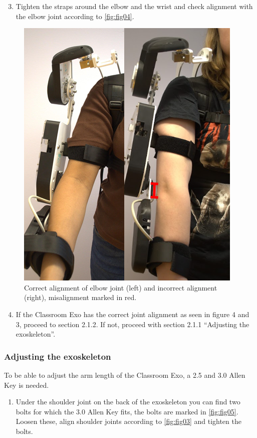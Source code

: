 \begin{enumerate}[]
	\setcounter{enumi}{2}
	\item Tighten the straps around the elbow and the wrist and check alignment with the elbow joint according to \autoref{fig:fig04}. 
\end{enumerate}

\begin{figure}[H]
	\centering
	\includegraphics[width=0.4\linewidth]{img/fig_04}
	\caption{Correct alignment of elbow joint (left) and incorrect alignment (right), misalignment marked in red.}
	\label{fig:fig04}
\end{figure}

\begin{enumerate}[]
	\setcounter{enumi}{3}
	\item If the Classroom Exo has the correct joint alignment as seen in figure 4 and 3, proceed to section 2.1.2. If not, proceed with section 2.1.1 “Adjusting the exoskeleton”.
\end{enumerate}

\subsubsection{Adjusting the exoskeleton}
To be able to adjust the arm length of the Classroom Exo, a 2.5 and 3.0 Allen Key is needed.

\begin{enumerate}[]
	\item Under the shoulder joint on the back of the exoskeleton you can find two bolts for which the 3.0 Allen Key fits, the bolts are marked in \autoref{fig:fig05}. Loosen these, align shoulder joints according to \autoref{fig:fig03} and tighten the bolts. 
\end{enumerate}



